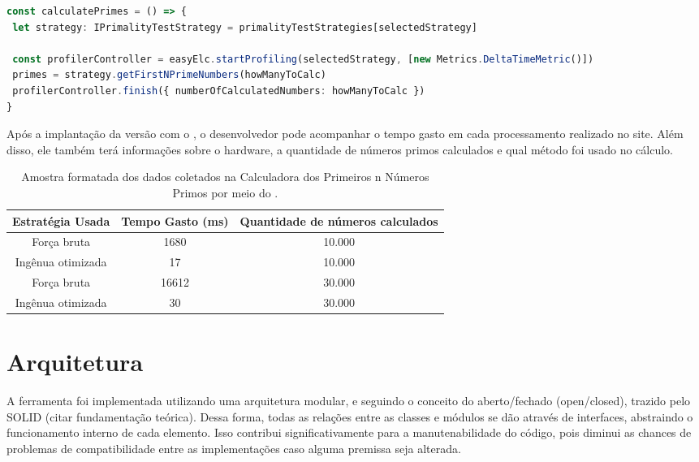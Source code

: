 \documentclass[12pt]{tcc}
\begin{document}
\begin{lstlisting}[label={lst:easyelc_usage_firstnprimes}, caption={Coleta de métricas usando o EasyElc no site Calculadora dos Primeiros n Números Primos.}, language=TypeScript, breaklines=true]
const calculatePrimes = () => {
 let strategy: IPrimalityTestStrategy = primalityTestStrategies[selectedStrategy]

 const profilerController = easyElc.startProfiling(selectedStrategy, [new Metrics.DeltaTimeMetric()])
 primes = strategy.getFirstNPrimeNumbers(howManyToCalc)
 profilerController.finish({ numberOfCalculatedNumbers: howManyToCalc })
}
\end{lstlisting}

Após a implantação da versão com o , o desenvolvedor pode acompanhar o tempo gasto em cada processamento realizado no site.
Além disso, ele também terá informações sobre o hardware, a quantidade de números primos calculados e qual método foi usado no cálculo.

\begin{table}[!h]
    \centering
    \caption{Amostra formatada dos dados coletados na Calculadora dos Primeiros n Números Primos por meio do .}
    \begin{tabular}{|c|c|c|}
        \hline
        Estratégia Usada & Tempo Gasto (ms) & Quantidade de números calculados\\
        \hline
		Força bruta & 1680 & 10.000 \\
        \hline
		Ingênua otimizada & 17 & 10.000 \\
        \hline
		Força bruta & 16612 & 30.000 \\
        \hline
        Ingênua otimizada & 30 & 30.000 \\
        \hline
    \end{tabular}
\end{table}

\section{Arquitetura}
\label{cap:arquitetura}

A ferramenta foi implementada utilizando uma arquitetura modular, e seguindo o conceito do aberto/fechado (open/closed), trazido pelo SOLID (citar fundamentação teórica). Dessa forma, todas as relações entre as classes e módulos se dão através de interfaces, abstraindo o funcionamento interno de cada elemento. Isso contribui significativamente para a manutenabilidade do código, pois diminui as chances de problemas de compatibilidade entre as implementações caso alguma premissa seja alterada.
\end{document}
